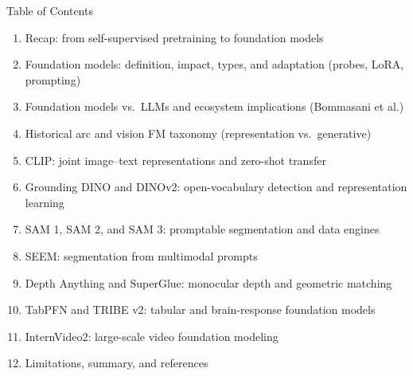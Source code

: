 \begin{frame}{Table of Contents}
  \small
  \begin{enumerate}\itemsep0.12em
    \item Recap: from self-supervised pretraining to foundation models
    \item Foundation models: definition, impact, types, and adaptation (probes, LoRA, prompting)
    \item Foundation models vs.\ LLMs and ecosystem implications (Bommasani et al.)
    \item Historical arc and vision FM taxonomy (representation vs.\ generative)
    \item CLIP: joint image--text representations and zero-shot transfer
    \item Grounding DINO and DINOv2: open-vocabulary detection and representation learning
    \item SAM 1, SAM 2, and SAM 3: promptable segmentation and data engines
    \item SEEM: segmentation from multimodal prompts
    \item Depth Anything and SuperGlue: monocular depth and geometric matching
    \item TabPFN and TRIBE v2: tabular and brain-response foundation models
    \item InternVideo2: large-scale video foundation modeling
    \item Limitations, summary, and references
  \end{enumerate}
\end{frame}
